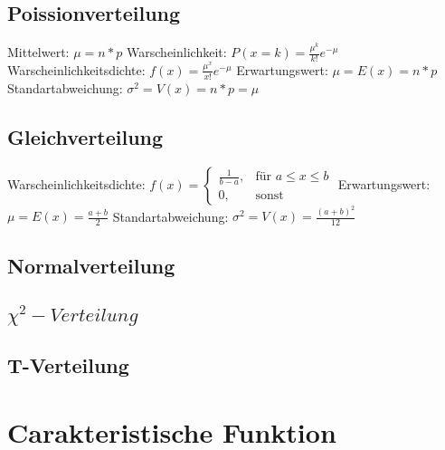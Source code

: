 \documentclass[a4paper, 11pt]{article}
\begin{document}
\subsection{Poissionverteilung}
Mittelwert:
\newline $\mu = n * p$
\newline\newline Warscheinlichkeit:
\newline $P(x=k) = \frac{\mu^k} {k!} e^{-\mu}$
\newline\newline Warscheinlichkeitsdichte:
\newline $f(x) = \frac{\mu^x} {x!} e^{-\mu}$
\newline\newline Erwartungswert:
\newline $\mu = E(x) = n * p$
\newline\newline Standartabweichung:
\newline $\sigma^2 = V(x)= n * p = \mu $
\subsection{Gleichverteilung}
Warscheinlichkeitsdichte:
\newline $f(x) = \begin {cases}
  \frac{1} {b-a}, & \text {für } a\le x \le b \\
  0, & \text{sonst}
\end{cases} $
\newline\newline Erwartungswert:
\newline $ \mu = E(x) = \frac { a + b } {2}$
\newline\newline Standartabweichung:
\newline $\sigma^2 = V(x)= \frac {(a + b)^2 } {12} $
\subsection{Normalverteilung}
\subsection{$\chi^2-Verteilung$}
\subsection{T-Verteilung}
\section{Carakteristische Funktion}
\end{document}
